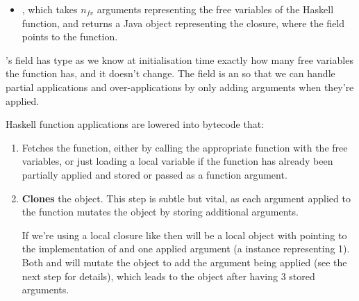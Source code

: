 \documentclass[dissertation.tex]{subfiles}
\begin{document}
{{{\begin{itemize}
{                , which takes two arrays of s as arguments, one holding the
                arguments for the Haskell function (of length \(n_a\)) and one holding the free variables used by
                the Haskell function (of length \(n_{fv}\)), and returns a  representing the result
                of applying the function.

            }
            \item
            {

                , which takes \(n_{fv}\) arguments representing the free variables of the
                Haskell function, and returns a Java  object representing the closure, where the
                 field points to the  function.

            }
            \end{itemize}
            
            's  field has type  as we know at initialisation
            time exactly how many free variables the function has, and it doesn't change. The  field
            is an  so that we can handle partial applications and over-applications by
            only adding arguments when they're applied.

            Haskell function applications are lowered into bytecode that:
            \begin{enumerate}
            \item
            {

                Fetches the function, either by calling the appropriate  function with the free
                variables, or just loading a local variable if the function has already been partially applied and
                stored or passed as a function argument.

            }
            \item
            {

                \textbf{Clones} the  object. This step is subtle but vital, as each argument applied
                to the function mutates the  object by storing additional arguments.
                
                If we're using a local closure like  then
                 will be a local  object with  pointing to the
                implementation of \haskell{(+)} and one applied argument (a  instance representing 1).
                Both  and  will mutate the object to add the argument being applied
                (see the next step for details), which leads to the  object after 
                having 3 stored arguments.

}
\end{enumerate}}}}
\end{document}
